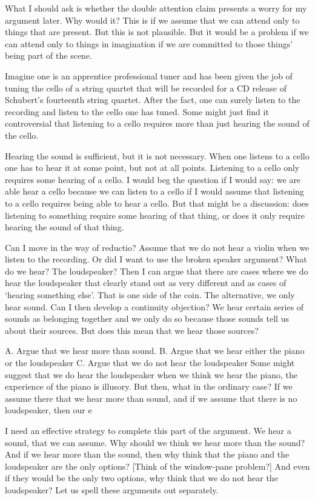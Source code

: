 \documentclass[sloppy, journal, git, bytitle, dodraft]{humapap}
\begin{document}
What I should ask is whether the double attention claim presents a worry for my argument later. Why would it? This is if we assume that we can attend only to things that are present. But this is not plausible. But it would be a problem if we can attend only to things in imagination if we are committed to those things' being part of the scene. 


Imagine one is an apprentice professional tuner and has been given the job of tuning the cello of a string quartet that will be recorded for a CD release of Schubert's fourteenth string quartet. After the fact, one can surely listen to the recording and listen to the cello one has tuned. Some might just find it controversial that listening to a cello requires more than just hearing the sound of the cello.

Hearing the sound is sufficient, but it is not necessary. When one listens to a cello one has to hear it at some point, but not at all points. Listening to a cello only requires some hearing of a cello. I would beg the question if I would say: we are able hear a cello because we can listen to a cello if I would assume that listening to a cello requires being able to hear a cello. But that might be a discussion: does listening to something require some hearing of that thing, or does it only require hearing the sound of that thing. 

Can I move in the way of reductio? Assume that we do not hear a violin when we listen to the recording. Or did I want to use the broken speaker argument? What do we hear? The loudspeaker? Then I can argue that there are cases where we do hear the loudspeaker that clearly stand out as very different and as cases of `hearing something else'. That is one side of the coin. The alternative, we only hear sound. Can I then develop a continuity objection? We hear certain series of sounds as belonging together and we only do so because those sounds tell us about their sources. But does this mean that we hear those sources? 

A. Argue that we hear more than sound.
B. Argue that we hear either the piano or the loudspeaker
C. Argue that we do not hear the loudspeaker
Some might suggest that we do hear the loudspeaker when we think we hear the piano, the experience of the piano is illusory. But then, what in the ordinary case? If we assume there that we hear more than sound, and if we assume that there is no loudspeaker, then our e

I need an effective strategy to complete this part of the argument. We hear a sound, that we can assume. Why should we think we hear more than the sound? And if we hear more than the sound, then why think that the piano and the loudspeaker are the only options? [Think of the window-pane problem?] And even if they would be the only two options, why think that we do not hear the loudspeaker? Let us spell these arguments out separately. 
\end{document}
